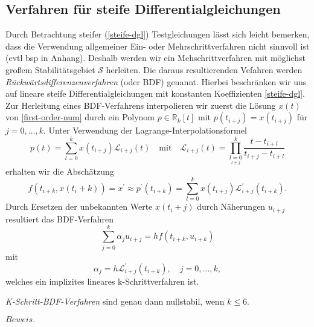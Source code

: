 \subsection{Verfahren für steife Differentialgleichungen}
Durch Betrachtung steifer (\ref{steife-dgl}) Testgleichungen lässt sich leicht bemerken, dass die
Verwendung allgemeiner Ein- oder Mehrschrittverfahren nicht sinnvoll ist (evtl bsp in Anhang). Deshalb werden wir ein
Mehschrittverfahren mit möglichst großem Stabilitätsgebiet $\mathcal{S}$ herleiten. Die daraus resultierenden Vefahren
werden \textit{Rückwärtsdifferenzenverfahren} (oder BDF) genannt. Hierbei beschränken wir uns auf lineare steife
Differentialgleichungen mit konstanten Koeffizienten \eqref{steife-dgl}.\\
Zur Herleitung eines BDF-Verfahrens interpolieren wir zuerst die Lösung $x(t)$ von \eqref{first-order-num} durch ein
Polynom $p \in \mathbb{R}_k[t]$ mit $p(t_{i+j}) = x(t_{i+j})$ für $j=0, \dots, k$. Unter Verwendung der
Lagrange-Interpolationsformel
\[
    p(t) = \sum_{l=0}^{k} x(t_{i+j}) \mathcal{L}_{i+j}(t) \quad \text{mit} \quad
    \mathcal{L}_{i+j}(t) = \prod\limits_{\underset{l \neq j}{l=0}}^{k} \frac{t-t_{i+l}}{t_{i+j}-t_{i+l}}
\]
erhalten wir die Abschätzung
\[
    f(t_{i+k},x(t_i+k)) = x^{\prime} \approx p^{\prime}(t_{i+k})
    = \sum_{l=0}^{k} x(t_{i+j})\mathcal{L}^{\prime}_{i+j}(t_{i+k}).
\]
Durch Ersetzen der unbekannten Werte $x(t_i+j)$ durch Näherungen $u_{i+j}$ resultiert das BDF-Verfahren
\[
    \sum_{j=0}^{k}\alpha_j u_{i+j} = h f(t_{i+k}, u_{i+k})
\]
mit
\[
    \alpha_j = h \mathcal{L}^{\prime}_{i+j} (t_{i+k}), \quad j=0,\dots,k,
\]
welches ein implizites lineares k-Schrittverfahren ist.\\
\begin{satz}
    \textit{K-Schritt-BDF-Verfahren} sind genau dann nullstabil, wenn $k \leq 6$.
\end{satz}
$Beweis.$ \cite[381-383]{ernsthairergerhardwannerSolvingOrdinaryDifferential}
